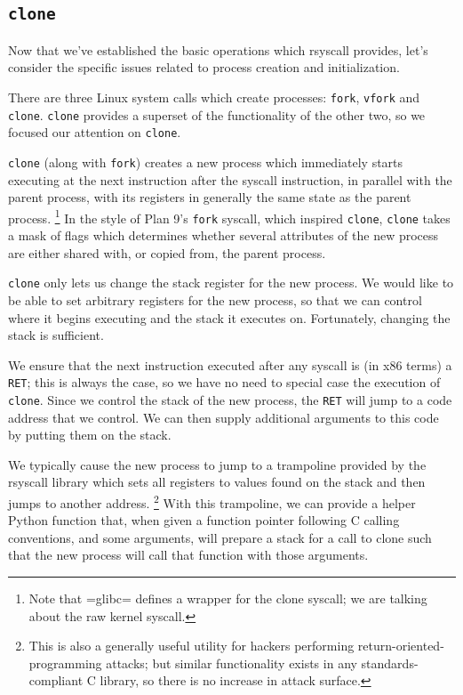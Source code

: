 \documentclass{acmart}
\begin{document}
\subsection{\texttt{clone}}\label{clone}
Now that we've established the basic operations which rsyscall provides,
let's consider the specific issues related to process creation and initialization.

There are three Linux system calls which create processes:
\texttt{fork}, \texttt{vfork} and \texttt{clone}.
\texttt{clone} provides a superset of the functionality of the other two,
so we focused our attention on \texttt{clone}.

\texttt{clone} (along with \texttt{fork}) creates a new process
which immediately starts executing at the next instruction after the syscall instruction,
in parallel with the parent process,
with its registers in generally the same state as the parent process.
\footnote{Note that =glibc= defines a wrapper for the clone syscall;
we are talking about the raw kernel syscall.}
In the style of Plan 9's \texttt{fork} syscall\cite{rfork}, which inspired \texttt{clone},
\texttt{clone} takes a mask of flags which determines whether several attributes of the new process
are either shared with, or copied from, the parent process.

\texttt{clone} only lets us change the stack register for the new process.
We would like to be able to set arbitrary registers for the new process,
so that we can control where it begins executing and the stack it executes on.
Fortunately, changing the stack is sufficient.

We ensure that the next instruction executed after any syscall
is (in x86 terms) a \texttt{RET};
this is always the case, so we have no need to special case the execution of \texttt{clone}.
Since we control the stack of the new process,
the \texttt{RET} will jump to a code address that we control.
We can then supply additional arguments to this code
by putting them on the stack.

We typically cause the new process to jump to a trampoline provided by the rsyscall library
which sets all registers to values found on the stack
and then jumps to another address.
\footnote{This is also a generally useful utility for hackers performing return-oriented-programming attacks;
but similar functionality exists in any standards-compliant C library,
so there is no increase in attack surface.}
With this trampoline,
we can provide a helper Python function that,
when given a function pointer following C calling conventions, and some arguments,
will prepare a stack for a call to clone such that the new process will call that function with those arguments.
\end{document}
